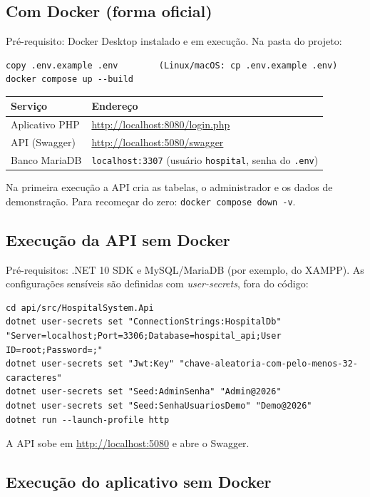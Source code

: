 \documentclass[12pt,a4paper]{article}
\newcommand{\cod}[1]{\texttt{#1}}
\begin{document}
\subsection{Com Docker (forma oficial)}

Pré-requisito: Docker Desktop instalado e em execução. Na pasta do projeto:

\begin{lstlisting}
copy .env.example .env        (Linux/macOS: cp .env.example .env)
docker compose up --build
\end{lstlisting}

\begin{tabularx}{\textwidth}{@{}lL@{}}
\toprule
\textbf{Serviço} & \textbf{Endereço} \\
\midrule
Aplicativo PHP      & \url{http://localhost:8080/login.php} \\
API (Swagger)       & \url{http://localhost:5080/swagger} \\
Banco MariaDB       & \cod{localhost:3307} (usuário \cod{hospital}, senha do \cod{.env}) \\
\bottomrule
\end{tabularx}

\medskip
Na primeira execução a API cria as tabelas, o administrador e os dados de demonstração. Para
recomeçar do zero: \cod{docker compose down -v}.

\subsection{Execução da API sem Docker}

Pré-requisitos: .NET 10 SDK e MySQL/MariaDB (por exemplo, do XAMPP). As configurações
sensíveis são definidas com \textit{user-secrets}, fora do código:

\begin{lstlisting}
cd api/src/HospitalSystem.Api
dotnet user-secrets set "ConnectionStrings:HospitalDb" "Server=localhost;Port=3306;Database=hospital_api;User ID=root;Password=;"
dotnet user-secrets set "Jwt:Key" "chave-aleatoria-com-pelo-menos-32-caracteres"
dotnet user-secrets set "Seed:AdminSenha" "Admin@2026"
dotnet user-secrets set "Seed:SenhaUsuariosDemo" "Demo@2026"
dotnet run --launch-profile http
\end{lstlisting}

A API sobe em \url{http://localhost:5080} e abre o Swagger.

\subsection{Execução do aplicativo sem Docker}
\end{document}
